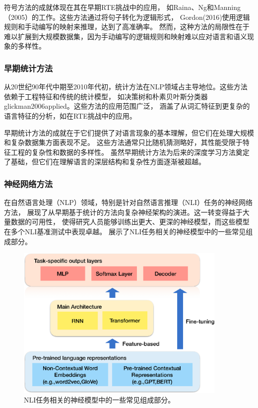 符号方法的成就体现在其在早期RTE挑战中的应用，
如Raina、Ng和Manning（2005）\cite{raina2005robust}的工作。这些方法通过将句子转化为逻辑形式，
Gordon(2016)\cite{gordon2016commonsense}使用逻辑规则和手动编写的映射来推理，达到了高准确率。
然而，这种方法的局限性在于难以扩展到大规模数据集，因为手动编写的逻辑规则和映射难以应对语言和语义现象的多样性\cite{kamath2018survey}。

\subsubsection*{早期统计方法}
从20世纪90年代中期至2010年代初，统计方法在NLP领域占主导地位。这些方法依赖于工程特征和传统的统计模型，
如决策树\cite{ng2000machine}和朴素贝叶斯分类器glickman2006applied。这些方法的应用范围广泛，
涵盖了从词汇特征到更复杂的语言特征的分析，如在RTE挑战中的应用\cite{dagan2005pascal,haim2006second}。

早期统计方法的成就在于它们提供了对语言现象的基本理解，但它们在处理大规模和复杂数据集方面表现不足。
这些方法通常只比随机猜测略好，其性能受限于特征工程的复杂性和数据的多样性\cite{haim2006second,lai2014illinois}。
虽然早期统计方法为后来的深度学习方法奠定了基础，但它们在理解语言的深层结构和复杂性方面逐渐被超越。

\subsubsection*{神经网络方法}
在自然语言处理（NLP）领域，特别是针对自然语言推理（NLI）任务的神经网络方法，
展现了从早期基于统计的方法向复杂神经架构的演进。这一转变得益于大量数据的可用性，
使得研究人员能够训练出更大、更深的神经模型，而这些模型在多个NLI基准测试中表现卓越。
展示了NLI任务相关的神经模型中的一些常见组成部分。

\begin{figure}[th]
  \centering\includegraphics[width=4in]{figures/xulun/neuralmodel.eps}
  \caption{NLI任务相关的神经模型中的一些常见组成部分。}
  \label{fig1:neuralmodel}
  \end{figure}

